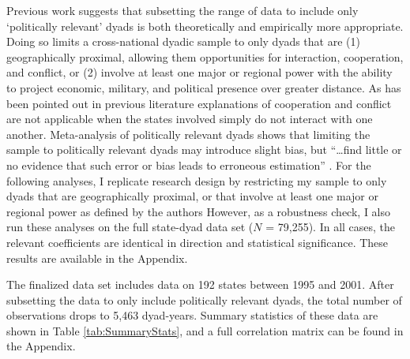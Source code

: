\documentclass[10pt,]{article}
\begin{document}
Previous work
\citetext{\citealp[e.g.][63-65]{Maoz1996}; \citealp[106-107]{Maoz2007}}
suggests that subsetting the range of data to include only `politically
relevant' dyads is both theoretically and empirically more appropriate.
Doing so limits a cross-national dyadic sample to only dyads that are
(1) geographically proximal, allowing them opportunities for
interaction, cooperation, and conflict, or (2) involve at least one
major or regional power with the ability to project economic, military,
and political presence over greater distance. As has been pointed out in
previous literature \citep[e.g.][]{Ward2007} explanations of cooperation
and conflict are not applicable when the states involved simply do not
interact with one another. Meta-analysis of politically relevant dyads
shows that limiting the sample to politically relevant dyads may
introduce slight bias, but ``\ldots{}find little or no evidence that
such error or bias leads to erroneous estimation''
\citep[140-141]{Lemke2001}. For the following analyses, I replicate
\citet[s]{Maoz2007} research design by restricting my sample to only
dyads that are geographically proximal, or that involve at least one
major or regional power as defined by the authors However, as a
robustness check, I also run these analyses on the full state-dyad data
set (\(N\) = 79,255). In all cases, the relevant coefficients are
identical in direction and statistical significance. These results are
available in the Appendix.

The finalized data set includes data on 192 states between 1995 and
2001. After subsetting the data to only include politically relevant
dyads, the total number of observations drops to 5,463 dyad-years.
Summary statistics of these data are shown in Table
\ref{tab:SummaryStats}, and a full correlation matrix can be found in
the Appendix.
\end{document}
